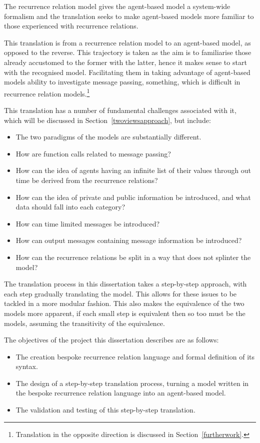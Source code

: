 \documentclass{article}
\begin{document}
The recurrence relation model gives the agent-based model a system-wide formalism and the translation seeks to make agent-based models more familiar to those experienced with recurrence relations.  

This translation is from a recurrence relation model to an agent-based model, as opposed to the reverse. This trajectory is taken as the aim is to familiarise those already accustomed to the former with the latter, hence it makes sense to start with the recognised model. Facilitating them in taking advantage of agent-based models ability to investigate message passing, something, which is difficult in recurrence relation models.\footnote{Translation in the opposite direction is discussed in Section~\ref{furtherwork}.}  

This translation has a number of fundamental challenges associated with it, which will be discussed in Section~\ref{twoviewsapproach}, but include:
\begin{itemize}
   \item The two paradigms of the models are substantially different. 
   \item How are function calls related to message passing?
   \item How can the idea of agents having an infinite list of their values through out time be derived from the recurrence relations? 
   \item How can the idea of private and public information be introduced, and what data should fall into each category? 
   \item How can time limited messages be introduced?
   \item How can output messages containing message information be introduced? 
   \item How can the recurrence relations be split in a way that does not splinter the model? 
\end{itemize}

The translation process in this dissertation takes a step-by-step approach, with each step gradually translating the model. This allows for these issues to be tackled in a more modular fashion. This also makes the equivalence of the two models more apparent, if each small step is equivalent then so too must be the models, assuming the transitivity of the equivalence. 

The objectives of the project this dissertation describes are as follows:
\begin{itemize}
   \item The creation bespoke recurrence relation language and formal definition of its syntax.
   \item The design of a step-by-step translation process, turning a model written in the bespoke recurrence relation language into an agent-based model. 
   \item The validation and testing of this step-by-step translation.  
\end{itemize}
\end{document}
